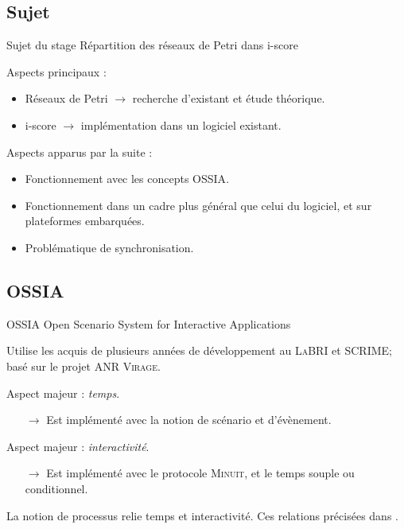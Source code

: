 \subsection{Sujet}
\begin{frame}{Sujet du stage}
	{\large Répartition des réseaux de Petri dans i-score}
	
	Aspects principaux : 
	\begin{itemize}
		\item Réseaux de Petri $\rightarrow$ recherche d'existant et étude théorique.
		\item i-score $\rightarrow$ implémentation dans un logiciel existant.
	\end{itemize} 
	\vspace{1em}
	Aspects apparus par la suite : 
	\begin{itemize}
		\item Fonctionnement avec les concepts {OSSIA}.
		\item Fonctionnement dans un cadre plus général que celui du logiciel, et sur plateformes embarquées.
		\item Problématique de synchronisation.
	\end{itemize}
	
\end{frame}

\subsection{OSSIA}
\begin{frame}{OSSIA}
	{\large Open Scenario System for Interactive Applications}
	
	Utilise les acquis de plusieurs années de développement au \textsc{LaBRI} et \textsc{SCRIME}; basé sur le projet \textsc{ANR Virage}.
	
	\vspace{1em}
	Aspect majeur : \emph{temps}.
	\begin{itemize}
		\item[$\rightarrow$] Est implémenté avec la notion de scénario et d'évènement.
	\end{itemize}
	
	Aspect majeur : \emph{interactivité}.
	\begin{itemize}
		\item[$\rightarrow$] Est implémenté avec le protocole \textsc{Minuit}, et le temps souple ou conditionnel.
	\end{itemize}
		
	La notion de processus relie temps et interactivité. Ces relations précisées dans \cite{hogue2014ossia}.
\end{frame}

